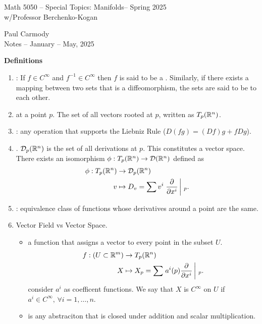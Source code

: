 \documentclass[10pt,a4paper]{report}
\newcommand{\CLASSNAME}{Math 5050 -- Special Topics: Manifolds}
\newcommand{\STUDENTNAME}{Paul Carmody}
\newcommand{\ASSIGNMENT}{Notes }
\newcommand{\DUEDATE}{January -- May, 2025}
\newcommand{\SEMESTER}{Spring 2025}
\begin{document}
\begin{center}
	\Large{\CLASSNAME -- \SEMESTER} \\
	\large{ w/Professor Berchenko-Kogan}
\end{center}
\begin{center}
	\STUDENTNAME \\
	\ASSIGNMENT -- \DUEDATE\\
\end{center} 

\noindent \textbf{Definitions}

\begin{enumerate}
	\item {}: If $f \in C^\infty$ and $f^{-1} \in C^\infty$ then $f$ is said to be a .  Similarly, if there exists a mapping between two sets that is a diffeomorphism, the sets are said to be  to each other.
	\item {} at a point $p$.  The set of all vectors rooted at $p$, written as $T_p(\mathbb{R}^n)$.  
	\item {}: any operation that supports the Liebniz Rule ($D(fg) = (Df)g+fDg$).
	\item {}. $\mathcal{D}_p(\mathbb{R}^n)$ is the set of all derivations at $p$.  This constitutes a vector space.  There exists an isomorphism $\phi: T_p(\mathbb{R}^n) \to \mathcal{D}(\mathbb{R}^n)$ defined as
	\begin{align*}
		\phi: T_p(\mathbb{R}^n) &\to \mathcal{D}_p(\mathbb{R}^n)\\
		v &\mapsto D_v=\sum v^i \left . \frac{\partial }{\partial x^i} \, \right |\,_p.
	\end{align*}
	\item {}: equivalence class of functions whose derivatives around a point are the same.
	\item Vector Field vs Vector Space.  
	\begin{itemize}
		\item {} a function that assigns a vector to every point in the subset $U$. 
		\begin{align*}
			f: (U\subset \mathbb{R}^m) &\to T_p( \mathbb{R}^n) \\
				X &\mapsto X_p=\sum \left . a^i(p) \frac{\partial }{\partial x^i}  \, \right |\,_p.
		\end{align*}consider $a^i$ as coefficent functions.  We say that $X$ is $C^\infty$ on $U$ if $a^i\in C^\infty, \, \forall i=1,\dots,n$.
		\item {} is any abstraciton that is closed under addition and scalar multiplication.

\end{itemize}
\end{enumerate}
\end{document}
